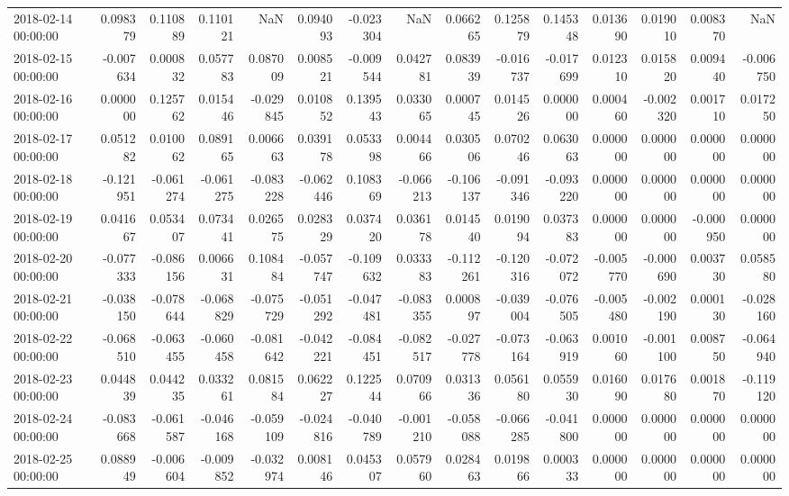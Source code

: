 \begin{tabular}{lrrrrrrrrrrrrrr}
2018-02-14 00:00:00 & 0.098379 & 0.110889 & 0.110121 & NaN & 0.094093 & -0.023304 & NaN & 0.066265 & 0.125879 & 0.145348 & 0.013690 & 0.019010 & 0.008370 & NaN \\
2018-02-15 00:00:00 & -0.007634 & 0.000832 & 0.057783 & 0.087009 & 0.008521 & -0.009544 & 0.042781 & 0.083939 & -0.016737 & -0.017699 & 0.012310 & 0.015820 & 0.009440 & -0.006750 \\
2018-02-16 00:00:00 & 0.000000 & 0.125762 & 0.015446 & -0.029845 & 0.010852 & 0.139543 & 0.033065 & 0.000745 & 0.014526 & 0.000000 & 0.000460 & -0.002320 & 0.001710 & 0.017250 \\
2018-02-17 00:00:00 & 0.051282 & 0.010062 & 0.089165 & 0.006663 & 0.039178 & 0.053398 & 0.004466 & 0.030506 & 0.070246 & 0.063063 & 0.000000 & 0.000000 & 0.000000 & 0.000000 \\
2018-02-18 00:00:00 & -0.121951 & -0.061274 & -0.061275 & -0.083228 & -0.062446 & 0.108369 & -0.066213 & -0.106137 & -0.091346 & -0.093220 & 0.000000 & 0.000000 & 0.000000 & 0.000000 \\
2018-02-19 00:00:00 & 0.041667 & 0.053407 & 0.073441 & 0.026575 & 0.028329 & 0.037420 & 0.036178 & 0.014540 & 0.019094 & 0.037383 & 0.000000 & 0.000000 & -0.000950 & 0.000000 \\
2018-02-20 00:00:00 & -0.077333 & -0.086156 & 0.006631 & 0.108484 & -0.057747 & -0.109632 & 0.033383 & -0.112261 & -0.120316 & -0.072072 & -0.005770 & -0.000690 & 0.003730 & 0.058580 \\
2018-02-21 00:00:00 & -0.038150 & -0.078644 & -0.068829 & -0.075729 & -0.051292 & -0.047481 & -0.083355 & 0.000897 & -0.039004 & -0.076505 & -0.005480 & -0.002190 & 0.000130 & -0.028160 \\
2018-02-22 00:00:00 & -0.068510 & -0.063455 & -0.060458 & -0.081642 & -0.042221 & -0.084451 & -0.082517 & -0.027778 & -0.073164 & -0.063919 & 0.001060 & -0.001100 & 0.008750 & -0.064940 \\
2018-02-23 00:00:00 & 0.044839 & 0.044235 & 0.033261 & 0.081584 & 0.062227 & 0.122544 & 0.070966 & 0.031336 & 0.056180 & 0.055930 & 0.016090 & 0.017680 & 0.001870 & -0.119120 \\
2018-02-24 00:00:00 & -0.083668 & -0.061587 & -0.046168 & -0.059109 & -0.024816 & -0.040789 & -0.001210 & -0.058088 & -0.066285 & -0.041800 & 0.000000 & 0.000000 & 0.000000 & 0.000000 \\
2018-02-25 00:00:00 & 0.088949 & -0.006604 & -0.009852 & -0.032974 & 0.008146 & 0.045307 & 0.057960 & 0.028463 & 0.019866 & 0.000333 & 0.000000 & 0.000000 & 0.000000 & 0.000000 \\

\end{tabular}
